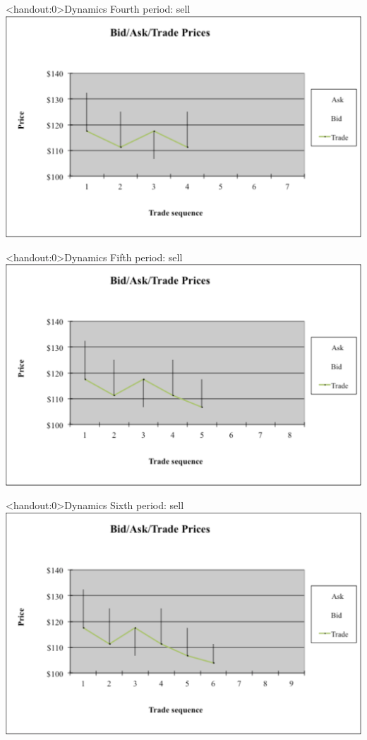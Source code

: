 \documentclass[english,10pt
,aspectratio=169
]{beamer}
\begin{document}
\begin{frame}<handout:0>{Dynamics}
	Fourth period: sell
	\center
	\includegraphics[width=0.9\linewidth]{pics/P4_Image.pdf}
\end{frame}


\begin{frame}<handout:0>{Dynamics}
	Fifth period: sell
	\center
	\includegraphics[width=0.9\linewidth]{pics/P5_Image.pdf}
\end{frame}


\begin{frame}<handout:0>{Dynamics}
	Sixth period: sell
	\center
	\includegraphics[width=0.9\linewidth]{pics/P6_Image.pdf}
\end{frame}
\end{document}
